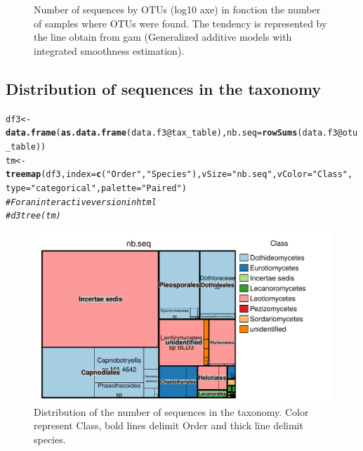 \documentclass[12pt]{article}\usepackage[]{graphicx}\usepackage[]{color}
\makeatletter
\def\maxwidth{ %
  \ifdim\Gin@nat@width>\linewidth
    \linewidth
  \else
    \Gin@nat@width
  \fi
}
\newcommand{\hlstr}[1]{\textcolor[rgb]{0.192,0.494,0.8}{#1}}%
\newcommand{\hlcom}[1]{\textcolor[rgb]{0.678,0.584,0.686}{\textit{#1}}}%
\newcommand{\hlopt}[1]{\textcolor[rgb]{0,0,0}{#1}}%
\newcommand{\hlstd}[1]{\textcolor[rgb]{0.345,0.345,0.345}{#1}}%
\newcommand{\hlkwb}[1]{\textcolor[rgb]{0.69,0.353,0.396}{#1}}%
\newcommand{\hlkwc}[1]{\textcolor[rgb]{0.333,0.667,0.333}{#1}}%
\newcommand{\hlkwd}[1]{\textcolor[rgb]{0.737,0.353,0.396}{\textbf{#1}}}%
\newenvironment{kframe}{%
 \def\at@end@of@kframe{}%
 \ifinner\ifhmode%
  \def\at@end@of@kframe{\end{minipage}}%
  \begin{minipage}{\columnwidth}%
 \fi\fi%
 \def\FrameCommand##1{\hskip\@totalleftmargin \hskip-\fboxsep
 \colorbox{shadecolor}{##1}\hskip-\fboxsep
     \hskip-\linewidth \hskip-\@totalleftmargin \hskip\columnwidth}%
 \MakeFramed {\advance\hsize-\width
   \@totalleftmargin\z@ \linewidth\hsize
   \@setminipage}}%
 {\par\unskip\endMakeFramed%
 \at@end@of@kframe}
\newenvironment{knitrout}{}{} %
\numberwithin{figure}{section}
\makeatother
\begin{document}
\begin{knitrout}
\begin{figure}
{}

\caption[Number of sequences by OTUs (log10 axe) in fonction the number of samples where OTUs were found]{Number of sequences by OTUs (log10 axe) in fonction the number of samples where OTUs were found. The tendency is represented by the line obtain from gam (Generalized additive models with integrated smoothness estimation).}\label{fig:unnamed-chunk-21}
\end{figure}


\end{knitrout}

  \subsection{Distribution of sequences in the taxonomy}
\begin{knitrout}\small
{}\color{fgcolor}\begin{kframe}
\begin{alltt}
\hlstd{df3} \hlkwb{<-} \hlkwd{data.frame}\hlstd{(}\hlkwd{as.data.frame}\hlstd{(data.f3}\hlopt{@}\hlkwc{tax_table}\hlstd{),} \hlkwc{nb.seq} \hlstd{=} \hlkwd{rowSums}\hlstd{(data.f3}\hlopt{@}\hlkwc{otu_table}\hlstd{))}
\hlstd{tm} \hlkwb{<-} \hlkwd{treemap}\hlstd{(df3,} \hlkwc{index} \hlstd{=} \hlkwd{c}\hlstd{(}\hlstr{"Order"}\hlstd{,} \hlstr{"Species"}\hlstd{),} \hlkwc{vSize} \hlstd{=} \hlstr{"nb.seq"}\hlstd{,} \hlkwc{vColor} \hlstd{=} \hlstr{"Class"}\hlstd{,}
        \hlkwc{type} \hlstd{=} \hlstr{"categorical"}\hlstd{,} \hlkwc{palette} \hlstd{=} \hlstr{"Paired"}\hlstd{)}
\hlcom{# For an interactive version in html}
\hlcom{# d3tree(tm) }
\end{alltt}
\end{kframe}\begin{figure}

{\centering \includegraphics[width=\maxwidth]{figure/unnamed-chunk-22-1} 

}

\caption[Distribution of the number of sequences in the taxonomy]{Distribution of the number of sequences in the taxonomy. Color represent Class, bold lines delimit Order and thick line delimit species.}\label{fig:unnamed-chunk-22}
\end{figure}


\end{knitrout}
\end{document}
